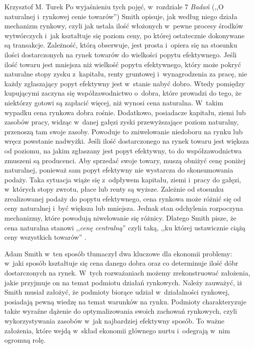 \begin{artplenv}{Krzysztof M. Turek}
Po wyjaśnieniu tych pojęć, w~rozdziale 7 \textit{Badań} (,,O naturalnej i~rynkowej cenie towarów'') Smith opisuje, jak
według niego działa mechanizm rynkowy, czyli jak ustala ilość włożonych w~pewne procesy środków wytwórczych i~jak
kształtuje się poziom ceny, po której ostatecznie dokonywane są transakcje. Zależność, którą obserwuje, jest
prosta i~opiera się na stosunku ilości dostarczonych na rynek towarów do wielkości popytu efektywnego. Jeśli ilość towaru jest
mniejsza niż wielkość popytu efektywnego, który może pokryć naturalne stopy zysku z~kapitału, renty
gruntowej i~wynagrodzenia za pracę, nie każdy zgłaszający popyt efektywny jest w~stanie nabyć dobro. Wtedy pomiędzy kupującymi
zaczyna się współzawodnictwo o~dobra, które prowadzi do tego, że niektórzy gotowi są zapłacić więcej, niż wynosi cena
naturalna. W~takim wypadku cena rynkowa dobra rośnie. Dodatkowo, posiadacze kapitału, ziemi lub zasobów pracy,
widząc w~danej gałęzi zyski przewyższające poziom naturalny, przenoszą tam swoje zasoby. Powoduje to zniwelowanie niedoboru na
rynku lub wręcz powstanie nadwyżki. Jeśli ilość dostarczonego na rynek towaru jest większa od poziomu, na jakim
zgłaszany jest popyt efektywny, to do współzawodnictwa zmuszeni są producenci. Aby sprzedać swoje towary, muszą obniżyć
cenę poniżej naturalnej, ponieważ sam popyt efektywny nie wystarcza do skonsumowania podaży. Taka sytuacja wiąże
się z~odpływem kapitału, ziemi i~pracy do gałęzi, w~których stopy zwrotu, płace lub renty są wyższe. Zależnie od stosunku
zrealizowanej podaży do popytu efektywnego, cena rynkowa może różnić się od ceny naturalnej i~być większa lub mniejsza.
Jednak stan odchylenia rozpoczyna mechanizmy, które powodują niwelowanie się różnicy. Dlatego Smith pisze, że cena
naturalna stanowi ,,\textit{cenę centralną}'' czyli taką, ,,ku której ustawicznie ciążą ceny wszystkich towarów''
\parencite[s.~70]{smith_badania_2007}.

Adam Smith w~ten sposób tłumaczył dwa kluczowe dla ekonomii problemy: w~jaki sposób kształtuje się cena danego dobra
oraz co determinuje ilość dóbr dostarczonych na rynek. W~tych rozważaniach możemy zrekonstruować założenia, jakie
przyjmuje on na temat podmiotu  działań rynkowych. Należy zauważyć, iż Smith musiał założyć, że podmioty
biorące udział w~działalności rynkowej,
posiadają pewną wiedzę na temat warunków na rynku. Podmioty charakteryzuje także wyraźne dążenie
do optymalizowania swoich zachowań rynkowych, czyli wykorzystywania zasobów w~jak najbardziej efektywny sposób. To
ważne założenia, które wejdą w~skład ekonomii głównego nurtu i~odegrają w~nim ogromną rolę.


\end{artplenv}
